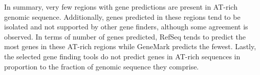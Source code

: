 In summary, very few regions with gene predictions are present in
AT-rich genomic sequence. Additionally, genes predicted in these
regions tend to be isolated and not supported by other gene finders,
although some agreement is observed. In terms of number of genes
predicted, RefSeq tends to predict the most genes in these AT-rich
regions while GeneMark predicts the fewest. Lastly, the selected gene
finding tools do not predict genes in AT-rich sequences in proportion
to the fraction of genomic sequence they comprise.
